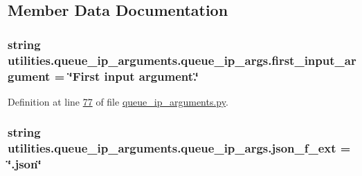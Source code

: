 \subsection{Member Data Documentation}
\hypertarget{classutilities_1_1queue__ip__arguments_1_1queue__ip__args_a14394c9820086e09d5b926d9910a180f}{}
\subsubsection[{first\+\_\+input\+\_\+argument}]{\setlength{\rightskip}{0pt plus 5cm}string utilities.\+queue\+\_\+ip\+\_\+arguments.\+queue\+\_\+ip\+\_\+args.\+first\+\_\+input\+\_\+argument = \char`\"{}First input argument.\char`\"{}\hspace{0.3cm}{\ttfamily [static]}}\label{classutilities_1_1queue__ip__arguments_1_1queue__ip__args_a14394c9820086e09d5b926d9910a180f}


Definition at line \hyperlink{queue__ip__arguments_8py_source_l00077}{77} of file \hyperlink{queue__ip__arguments_8py_source}{queue\+\_\+ip\+\_\+arguments.\+py}.

\hypertarget{classutilities_1_1queue__ip__arguments_1_1queue__ip__args_a8d93f9ade7608583602a9948c0d744f7}{}
\subsubsection[{json\+\_\+f\+\_\+ext}]{\setlength{\rightskip}{0pt plus 5cm}string utilities.\+queue\+\_\+ip\+\_\+arguments.\+queue\+\_\+ip\+\_\+args.\+json\+\_\+f\+\_\+ext = \char`\"{}.json\char`\"{}\hspace{0.3cm}{\ttfamily [static]}}\label{classutilities_1_1queue__ip__arguments_1_1queue__ip__args_a8d93f9ade7608583602a9948c0d744f7}


